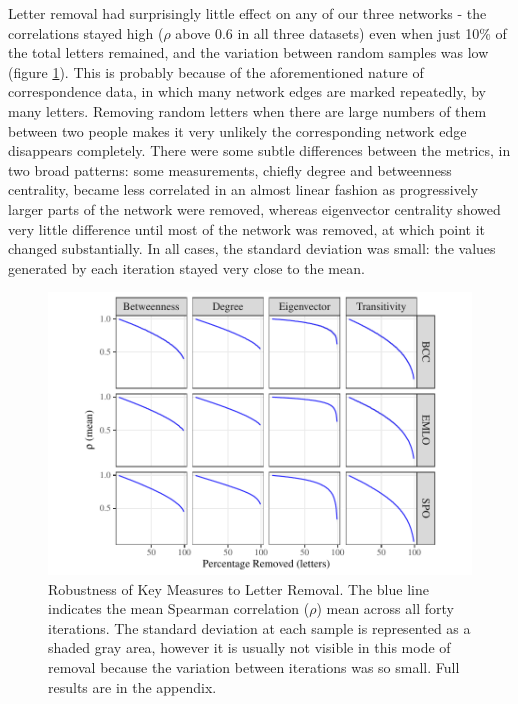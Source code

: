 \documentclass[]{article}
\begin{document}
Letter removal had surprisingly little effect on any of our three networks - the correlations stayed high (\(\rho\) above 0.6 in all three datasets) even when just 10\% of the total letters remained, and the variation between random samples was low (figure \ref{fig:lettersRemoval}). This is probably because of the aforementioned nature of correspondence data, in which many network edges are marked repeatedly, by many letters. Removing random letters when there are large numbers of them between two people makes it very unlikely the corresponding network edge disappears completely. There were some subtle differences between the metrics, in two broad patterns: some measurements, chiefly degree and betweenness centrality, became less correlated in an almost linear fashion as progressively larger parts of the network were removed, whereas eigenvector centrality showed very little difference until most of the network was removed, at which point it changed substantially. In all cases, the standard deviation was small: the values generated by each iteration stayed very close to the mean.

\begin{figure}

{\centering \includegraphics{network_robustness_article_anon_files/figure-latex/lettersRemoval-1} 

}

\caption{Robustness of Key Measures to Letter Removal. The blue line indicates the mean Spearman correlation ($\rho$) mean across all forty iterations. The standard deviation at each sample is represented as a shaded gray area, however it is usually not visible in this mode of removal because the variation between iterations was so small. Full results are in the appendix.}\label{fig:lettersRemoval}
\end{figure}
\end{document}
